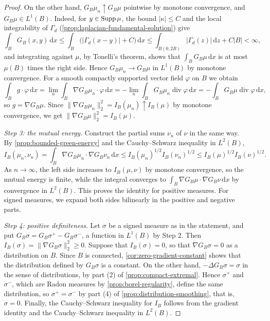 \begin{proof}
On the other hand, $G_B\mu_n\uparrow G_B\mu$ pointwise by monotone convergence, and $G_B\mu\in L^1(B)$. Indeed, for $y\in\operatorname{Supp}\mu$, the bound $|\kappa|\leq C$ and the local integrability of $\Gamma_d$ (\cref{prop:laplacian-fundamental-solution}) give
\[
 \int_BG_B(x,y)\,\mathrm d x\leq\int_B\bigl(|\Gamma_d(x-y)|+C\bigr)\,\mathrm d x\leq\int_{B(0,2R)}|\Gamma_d(z)|\,\mathrm d z+C|B|<\infty,
\]
and integrating against $\mu$, by Tonelli's theorem, shows that $\int_BG_B\mu\,\mathrm d x$ is at most $\mu(B)$ times the right side. Hence $G_B\mu_n\to G_B\mu$ in $L^1(B)$ by monotone convergence. For a smooth compactly supported vector field $\varphi$ on $B$ we obtain
\[
 \int_Bg\mathbin{\cdot}\varphi\,\mathrm d x=\lim_n\int_B\nabla G_B\mu_n\mathbin{\cdot}\varphi\,\mathrm d x=-\lim_n\int_BG_B\mu_n\operatorname{div}\varphi\,\mathrm d x=-\int_BG_B\mu\operatorname{div}\varphi\,\mathrm d x,
\]
so $g=\nabla G_B\mu$. Since $\|\nabla G_B\mu_n\|_2^2=I_B(\mu_n)\uparrow I_B(\mu)$ by monotone convergence, we get $\|\nabla G_B\mu\|_2^2=I_B(\mu)$.

\emph{Step 3: the mutual energy.} Construct the partial sums $\nu_n$ of $\nu$ in the same way. By \cref{prop:bounded-green-energy} and the Cauchy--Schwarz inequality in $L^2(B)$,
\[
 I_B(\mu_n,\nu_n)=\int_B\nabla G_B\mu_n\mathbin{\cdot}\nabla G_B\nu_n\,\mathrm d x\leq I_B(\mu_n)^{1/2}I_B(\nu_n)^{1/2}\leq I_B(\mu)^{1/2}I_B(\nu)^{1/2}.
\]
As $n\to\infty$, the left side increases to $I_B(\mu,\nu)$ by monotone convergence, so the mutual energy is finite, while the integral converges to $\int_B\nabla G_B\mu\mathbin{\cdot}\nabla G_B\nu\,\mathrm d x$ by convergence in $L^2(B)$. This proves the identity for positive measures. For signed measures, we expand both sides bilinearly in the positive and negative parts.

\emph{Step 4: positive definiteness.} Let $\sigma$ be a signed measure as in the statement, and put $G_B\sigma=G_B\sigma^+-G_B\sigma^-$, a function in $L^1(B)$ by Step 2. Then $I_B(\sigma)=\|\nabla G_B\sigma\|_2^2\geq0$. Suppose that $I_B(\sigma)=0$, so that $\nabla G_B\sigma=0$ as a distribution on $B$. Since $B$ is connected, \cref{cor:zero-gradient-constant} shows that the distribution defined by $G_B\sigma$ is a constant. On the other hand, $-\Delta G_B\sigma=\sigma$ in the sense of distributions, by part (2) of \cref{prop:compact-extremal}. Hence $\sigma^+$ and $\sigma^-$, which are Radon measures by \cref{prop:borel-regularity}, define the same distribution, so $\sigma^+=\sigma^-$ by part (4) of \cref{prop:distribution-smoothing}, that is, $\sigma=0$. Finally, the Cauchy--Schwarz inequality for $I_B$ follows from the gradient identity and the Cauchy--Schwarz inequality in $L^2(B)$.
\end{proof}


